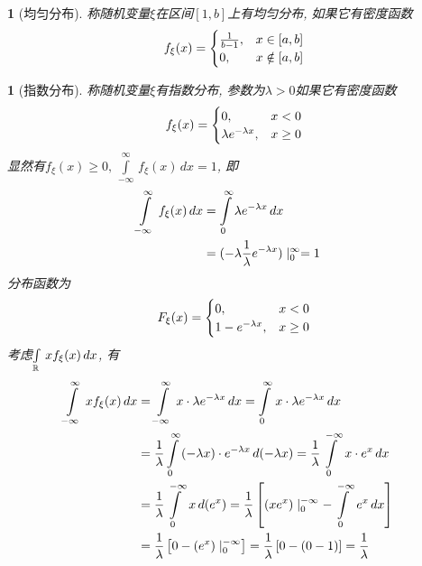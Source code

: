 \newtheorem{uniform_distru}[dis_root]{\disfunc}
\newtheorem{exponential_distru}[dis_root]{\disfunc}
\newtheorem{gauss_distru}[dis_root]{\disfunc}
\newtheorem{logarithm_distru}[dis_root]{\disfunc}
\newtheorem{gamma_distru}[dis_root]{\disfunc}
\newtheorem{beta_distru}[dis_root]{\disfunc}

\begin{uniform_distru}[均匀分布]
称随机变量\(\xi\)在区间\([1, b]\)上有均匀分布, 如果它有密度函数
\begin{align}
f_\xi(x) = \begin{cases}{1\over b - 1}, & x\in [a,b]\cr 0, & x\notin[a, b]\end{cases}
\end{align}
\end{uniform_distru}

\begin{exponential_distru}[指数分布]
称随机变量\(\xi\)有指数分布, 参数为\(\lambda > 0\)如果它有密度函数
\begin{align}
f_\xi(x) = \begin{cases}0, & x<0\cr \lambda e^{-\lambda x}, & x\ge 0\end{cases}\end{align}
显然有\(f_\xi(x)\ge 0,\,\int\limits_{-\infty}^{\infty}\,f_\xi(x)\,dx = 1\), 即
\begin{align*}
\int\limits_{-\infty}^{\infty}\,f_\xi(x)\,dx &= \int\limits_{0}^{\infty}\lambda e^{-\lambda x}\,dx\cr
&= (-\lambda{1\over\lambda}e^{-\lambda x})\mid_{0}^{\infty} = 1
\end{align*}
分布函数为
\begin{align}
F_\xi(x) = \begin{cases}0, & x<0\cr 1 - e^{-\lambda x}, & x\ge 0\end{cases}
\end{align}
考虑\(\int\limits_{\Rs}\,xf_\xi(x)\,dx\), 有
\begin{align}
\int\limits_{-\infty}^{\infty}\,xf_\xi(x)\,dx &= \int\limits_{-\infty}^{\infty}\,x\cdot \lambda e^{-\lambda x}\,dx
= \int\limits_{0}^{\infty}\,x\cdot \lambda e^{-\lambda x}\,dx\cr
&= {1\over \lambda}\int\limits_{0}^{\infty}\,(- \lambda x)\cdot e^{-\lambda x}\,d(-\lambda x)
= {1\over \lambda}\int\limits_{0}^{-\infty}\,x\cdot e^x\,dx\cr
&= {1\over \lambda}\int\limits_{0}^{-\infty}\,x\,d(e^x)
= {1\over \lambda}\left[\left(xe^x\right)\mid_{0}^{-\infty} - \int\limits_{0}^{-\infty}\,e^x\,dx\right]\cr
&= {1\over \lambda}\left[0 - (e^x)\mid_{0}^{-\infty}\right]
= {1\over \lambda}\left[0 - (0 - 1)\right]
= {1\over\lambda}
\end{align}
\end{exponential_distru}

